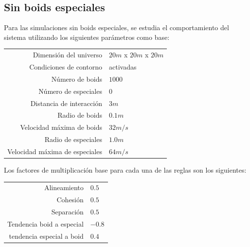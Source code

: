 \documentclass[a4paper]{article}
\begin{document}
        \subsection{Sin boids especiales}
            Para las simulaciones sin boids especiales, se estudia el comportamiento del sistema utilizando los siguientes parámetros como base:
                \begin{table}[h]
                    \centering
                    \begin{tabular}{|r|l|}
                        \hline
                        Dimensión del universo & $20m$ x $20m$ x $20m$ \\
                        Condiciones de contorno & activadas \\
                        Número de boids & $1000$ \\
                        Número de especiales & $0$ \\
                        Distancia de interacción & $3m$ \\
                        Radio de boids & $0.1m$ \\
                        Velocidad máxima de boids & $32 m/s$ \\
                        Radio de especiales & $1.0m$ \\
                        Velocidad máxima de especiales & $64 m/s$ \\
                        \hline
                    \end{tabular}
                \end{table}

            Los factores de multiplicación base para cada una de las reglas son los siguientes:

                \begin{table}[h]
                    \centering
                    \begin{tabular}{|r|l|}
                        \hline
                        Alineamiento & $0.5$ \\
                        Cohesión & $0.5$ \\
                        Separación & $0.5$ \\
                        Tendencia boid a especial & $-0.8$ \\
                        tendencia especial a boid & $0.4$ \\
                        \hline
                    \end{tabular}
                \end{table}
\end{document}
